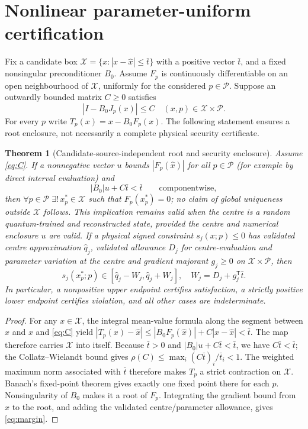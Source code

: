 \documentclass[11pt,a4paper]{article}
\newtheorem{theorem}{Theorem}[section]
\theoremstyle{remark}\newtheorem{remark}[theorem]{Remark}
\newcommand{\boxx}{\mathcal X}\newcommand{\pp}{\mathcal P}
\begin{document}
\section{Nonlinear parameter-uniform certification}\label{sec:cert}
Fix a candidate box $\boxx=\{x:|x-\widehat x|\le \bar t\}$ with a positive vector $\bar t$, and a fixed nonsingular preconditioner $B_0$. Assume $F_p$ is continuously differentiable on an open neighbourhood of $\boxx$, uniformly for the considered $p\in\pp$. Suppose an outwardly bounded matrix $C\ge0$ satisfies
\begin{equation}\label{eq:C}
|I-B_0J_p(x)|\le C\quad(x,p)\in\boxx\times\pp.
\end{equation}
For every $p$ write $T_p(x)=x-B_0F_p(x)$. The following statement ensures a root enclosure, not necessarily a complete physical security certificate.
\begin{theorem}[Candidate-source-independent root and security enclosure]\label{thm:root}
Assume \eqref{eq:C}. If a nonnegative vector $u$ bounds $|F_p(\widehat x)|$ for all $p\in\pp$ (for example by direct interval evaluation) and
\begin{equation}\label{eq:inclusion}
|B_0|u+C\bar t<\bar t\qquad\text{componentwise},
\end{equation}
then $\forall p\in\pp\;\exists!\,x_p^*\in\boxx$ such that $F_p(x_p^*)=0$; no claim of global uniqueness outside $\boxx$ follows. This implication remains valid when the centre is a random quantum-trained and reconstructed state, provided the centre and numerical enclosure $u$ are valid. If a physical signed constraint $s_j(x;p)\le0$ has validated centre approximation $\widehat q_j$, validated allowance $D_j$ for centre-evaluation and parameter variation at the centre and gradient majorant $g_j\ge0$ on $\boxx\times\pp$, then
\begin{equation}\label{eq:margin}
s_j(x_p^*;p)\in[\widehat q_j-W_j,\widehat q_j+W_j],\quad W_j=D_j+g_j^\mathsf T\bar t.
\end{equation}
In particular, a nonpositive upper endpoint certifies satisfaction, a strictly positive lower endpoint certifies violation, and all other cases are indeterminate.
\end{theorem}
\begin{proof}
For any $x\in\boxx$, the integral mean-value formula along the segment between $\widehat x$ and $x$ and \eqref{eq:C} yield
$|T_p(x)-\widehat x|\le|B_0F_p(\widehat x)|+C|x-\widehat x|<\bar t$.
The map therefore carries $\boxx$ into itself. Because $\bar t>0$ and $|B_0|u+C\bar t<\bar t$, we have $C\bar t<\bar t$; the Collatz--Wielandt bound gives $\rho(C)\le\max_i(C\bar t)_i/\bar t_i<1$. The weighted maximum norm associated with $\bar t$ therefore makes $T_p$ a strict contraction on $\boxx$. Banach's fixed-point theorem gives exactly one fixed point there for each $p$. Nonsingularity of $B_0$ makes it a root of $F_p$. Integrating the gradient bound from $\widehat x$ to the root, and adding the validated centre/parameter allowance, gives \eqref{eq:margin}.
\end{proof}
\end{document}
